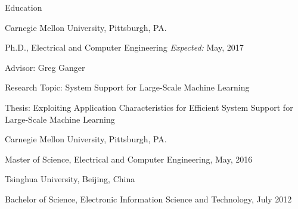 \documentclass{resume} %
\begin{document}





\begin{rSection}{Education}

\begin{rSubsection}{Carnegie Mellon University, Pittsburgh, PA.}{}{}{}
\item[] Ph.D., Electrical and Computer Engineering \hfill \emph{Expected:} May, 2017
\item Advisor: Greg Ganger
\item Research Topic: System Support for Large-Scale Machine Learning
\item Thesis: Exploiting Application Characteristics for Efficient System Support for Large-Scale Machine Learning
\end{rSubsection}

\begin{rSubsection}{Carnegie Mellon University, Pittsburgh, PA.}{}{}{}
\item[] Master of Science, Electrical and Computer Engineering, \hfill May, 2016
\end{rSubsection}

\begin{rSubsection}{Tsinghua University, Beijing, China}{}{}{}
\item[] Bachelor of Science, Electronic Information Science and Technology, \hfill July 2012
\end{rSubsection}

\end{rSection}
\end{document}
